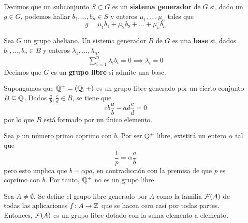 Decimos que un subconjunto $S \subset G$ es un \textbf{sistema generador} de $G$
si, dado un $g \in G$, podemos hallar $b_1,\dots,b_n \in S$ y enteros
$\mu_1,\dots,\mu_n$ tales que
\[g=\mu_1b_1+\mu_2b_2+\dots+\mu_nb_n\]

\begin{definition}
Sea $G$ un grupo abeliano. Un sistema generador $B$ de $G$ es una \textbf{base}
si, dados $b_1,\dots,b_n \in B$ y enteros $\lambda_1,\dots,\lambda_n$,
\begin{align}
	\label{SisLibre} \sum^n_{i=1}\lambda_ib_i=0 \implies \lambda_i=0
\end{align}
Decimos que $G$ es un \textbf{grupo libre} si admite una base.
\end{definition}

\begin{example}
	Supongamos que $\mathbb{Q}^+=(\mathbb{Q},+)$ es un grupo libre generado por un cierto
	conjunto $B \subseteq \mathbb{Q}$. Dados $\frac{a}{b}, \frac{c}{d} \in B$, se tiene
	que
		\[cb\frac{a}{b}-ad\frac{c}{d}=0\]
	por lo que $B$ está formado por un único elemento.

	Sea $p$ un número primo coprimo con $b$. Por ser $\mathbb{Q}^+$ libre, existirá un
	entero $\alpha$ tal que
		\[\frac{1}{p}=\alpha\frac{a}{b}\]
	pero esto implica que $b=\alpha pa$, en contradicción con la premisa de que $p$
	es coprimo con $b$. Por tanto, $\mathbb{Q}^+$ no es un grupo libre.
\end{example}


\begin{proposition}
	Sea $A \neq\emptyset$.
	Se define el grupo libre generado por $A$ como la familia $\mathcal{F}(A)$ de todas las aplicaciones $f\colon A \to \mathbb{Z}$ que se hacen cero casi por todas partes.
	Entonces, $\mathcal{F}(A)$ es un grupo libre dotado con la suma elemento a elemento.
\end{proposition}


